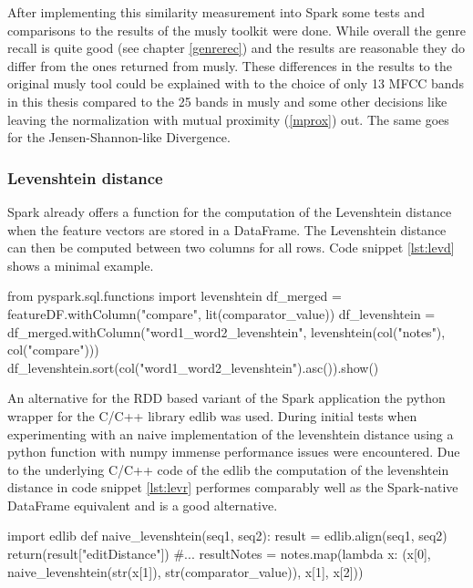 \noindent After implementing this similarity measurement into Spark some tests and comparisons to the results of the musly toolkit \cite{musly1} were done. While overall the genre recall is quite good (see chapter \ref{genrerec}) and the results are reasonable they do differ from the ones returned from musly. 
These differences in the results to the original musly tool could be explained with to the choice of only 13 MFCC bands in this thesis compared to the 25 bands in musly \cite{musly1} and some other decisions like leaving the normalization with mutual proximity (\ref{mprox}) out. The same goes for the Jensen-Shannon-like Divergence. 


\subsubsection{Levenshtein distance}

Spark already offers a function for the computation of the Levenshtein distance when the feature vectors are stored in a DataFrame. The Levenshtein distance can then be computed between two columns for all rows. Code snippet \ref{lst:levd} shows a minimal example. 

\begin{pythonCode}[frame=single,label={lst:levd},caption={Levenshtein DataFrame},captionpos=b]
from pyspark.sql.functions import levenshtein 
df_merged = featureDF.withColumn("compare", lit(comparator_value)) 
df_levenshtein = df_merged.withColumn("word1_word2_levenshtein", levenshtein(col("notes"), col("compare")))
df_levenshtein.sort(col("word1_word2_levenshtein").asc()).show()
\end{pythonCode}

\noindent An alternative for the RDD based variant of the Spark application the python wrapper for the C/C++ library edlib was used. During initial tests when experimenting with an naive implementation of the levenshtein distance using a python function with numpy immense performance issues were encountered. Due to the underlying C/C++ code of the edlib the computation of the levenshtein distance in code snippet \ref{lst:levr} performes comparably well as the Spark-native DataFrame equivalent and is a good alternative. 

\begin{pythonCode}[frame=single,label={lst:levr},caption={Levenshtein RDD},captionpos=b]
import edlib
def naive_levenshtein(seq1, seq2):
    result = edlib.align(seq1, seq2)
    return(result["editDistance"])
#...
resultNotes = notes.map(lambda x: (x[0], naive_levenshtein(str(x[1]), str(comparator_value)), x[1], x[2]))
\end{pythonCode}

